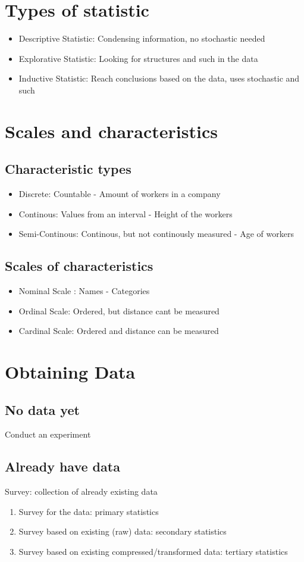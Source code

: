 \documentclass{article}
\begin{document}
\section{Types of statistic}
\begin{itemize}
    \item Descriptive Statistic: Condensing information, no stochastic needed
    \item Explorative Statistic: Looking for structures and such in the data
    \item Inductive Statistic: Reach conclusions based on the data, uses stochastic and such
\end{itemize}

\section{Scales and characteristics}
\subsection{Characteristic types}
\begin{itemize}
    \item Discrete: Countable - Amount of workers in a company
    \item Continous: Values from an interval - Height of the workers
    \item Semi-Continous: Continous, but not continously measured - Age of workers
\end{itemize}
\subsection{Scales of characteristics}
\begin{itemize}
    \item Nominal Scale : Names - Categories
    \item Ordinal Scale: Ordered, but distance cant be measured
    \item Cardinal Scale: Ordered and distance can be measured
\end{itemize}

\section{Obtaining Data}
\subsection{No data yet}
Conduct an experiment
\subsection{Already have data}
Survey: collection of already existing data
\begin{enumerate}
    \item Survey for the data: primary statistics
    \item Survey based on existing (raw) data: secondary statistics
    \item Survey based on existing compressed/transformed data: tertiary statistics
\end{enumerate}
\end{document}
